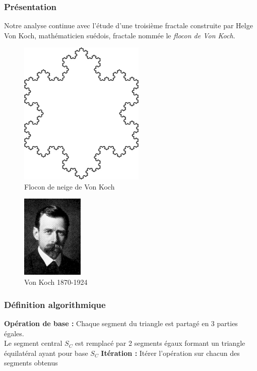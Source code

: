\documentclass[a4paper,10pt]{report}
\begin{document}
\subsubsection{Présentation}
\begin{minipage}[c]{.70\linewidth}
	\indent Notre analyse continue avec l'étude d'une troisième fractale construite par Helge Von Koch, mathématicien suédois, fractale nommée le \textit{flocon de Von Koch}.
	\begin{figure}[H]
	\centering
	\caption{Flocon de neige de Von Koch}
	\includegraphics[width=6cm]{koch.jpg}
	\end{figure}
\end{minipage} \hfill
\begin{minipage}[c]{.05\linewidth}
\end{minipage} \hfill
\begin{minipage}[c]{.21\linewidth}
	\begin{figure}[H]
	\includegraphics[height=4cm]{mr_koch.png}
	\caption{Von Koch 1870-1924}
	\end{figure}
\end{minipage}

\newpage
\subsubsection{Définition algorithmique}
\begin{algorithm}
\begin{algorithmic}
\STATE \textbf{Opération de base :} Chaque segment du triangle est partagé en 3 parties égales.\\
Le segment central $S_C$ est remplacé par 2 segments égaux formant un triangle équilatéral ayant pour base $S_C$
\STATE \textbf{Itération :} Itérer l'opération sur chacun des segments obtenus
\end{algorithmic}
\end{algorithm}
\end{document}
